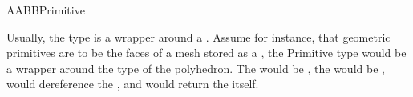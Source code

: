 \begin{ccRefConcept}{AABBPrimitive}
\ccExample

Usually, the  type is a wrapper around a . Assume for instance, that geometric primitives 
are to be the faces of a mesh stored as a , the Primitive type would be a wrapper around the   type of the polyhedron. The  would be ,
 the  would be ,  would dereference the , and  would return the  itself. 




\end{ccRefConcept}

\ccRefPageEnd


